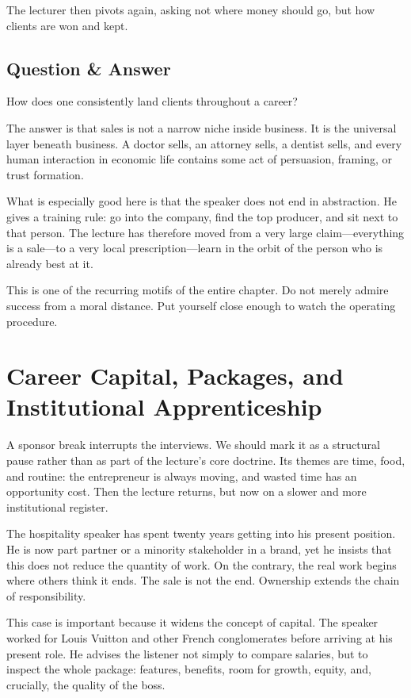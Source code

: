 The lecturer then pivots again, asking not where money should go, but how clients are won and kept.

\subsection{Question \& Answer}

How does one consistently land clients throughout a career?

The answer is that sales is not a narrow niche inside business. It is the universal layer beneath business. A doctor sells, an attorney sells, a dentist sells, and every human interaction in economic life contains some act of persuasion, framing, or trust formation.

What is especially good here is that the speaker does not end in abstraction. He gives a training rule: go into the company, find the top producer, and sit next to that person. The lecture has therefore moved from a very large claim---everything is a sale---to a very local prescription---learn in the orbit of the person who is already best at it.

This is one of the recurring motifs of the entire chapter. Do not merely admire success from a moral distance. Put yourself close enough to watch the operating procedure.

\section{Career Capital, Packages, and Institutional Apprenticeship}

A sponsor break interrupts the interviews. We should mark it as a structural pause rather than as part of the lecture's core doctrine. Its themes are time, food, and routine: the entrepreneur is always moving, and wasted time has an opportunity cost. Then the lecture returns, but now on a slower and more institutional register.

The hospitality speaker has spent twenty years getting into his present position. He is now part partner or a minority stakeholder in a brand, yet he insists that this does not reduce the quantity of work. On the contrary, the real work begins where others think it ends. The sale is not the end. Ownership extends the chain of responsibility.

This case is important because it widens the concept of capital. The speaker worked for Louis Vuitton and other French conglomerates before arriving at his present role. He advises the listener not simply to compare salaries, but to inspect the whole package: features, benefits, room for growth, equity, and, crucially, the quality of the boss.

